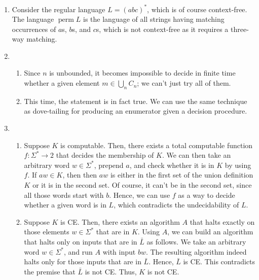 \documentclass[letterpaper,11pt]{article}
\DeclareMathOperator{\perm}{perm}
\begin{document}
\begin{enumerate}
    \item
        Consider the regular language $L = (abc)^*$, which is of course
        context-free. The language $\perm{L}$ is the language of all strings
        having matching occurrences of $a$s, $b$s, and $c$s, which is not
        context-free as it requires a three-way matching.

    \item
        \begin{enumerate}
            \item
                Since $n$ is unbounded, it becomes impossible to decide in
                finite time whether a given element $m \in \bigcup_n C_n$; we
                can't just try all of them.

            \item
                This time, the statement is in fact true. We can use the same
                technique as dove-tailing for producing an enumerator given
                a decision procedure.
        \end{enumerate}

    \item
        \begin{enumerate}
            \item
                Suppose $K$ is computable. Then, there exists a total
                computable function $f : \Sigma^* \to 2$ that decides the
                membership of $K$. We can then take an arbitrary word
                $w \in \Sigma^*$, prepend $a$, and check whether it is in $K$
                by using $f$. If $aw \in K$, then then $aw$ is either in the
                first set of the union definition $K$ or it is in the second
                set. Of course, it can't be in the second set, since all those
                words start with $b$. Hence, we can use $f$ as a way to decide
                whether a given word is in $L$, which contradicts the
                undecidability of $L$.

            \item
                Suppose $K$ is CE. Then, there exists an algorithm $A$ that
                halts exactly on those elements $w \in \Sigma^*$ that are in
                $K$. Using $A$, we can build an algorithm that halts only on
                inputs that are in $\bar L$ as follows. We take an arbitrary
                word $w \in \Sigma^*$, and run $A$ with input $bw$. The
                resulting algorithm indeed halts only for those inputs that are
                in $\bar L$. Hence, $\bar L$ is CE. This contradicts the
                premise that $\bar L$ is not CE. Thus, $K$ is not CE.


\end{enumerate}
\end{enumerate}
\end{document}
